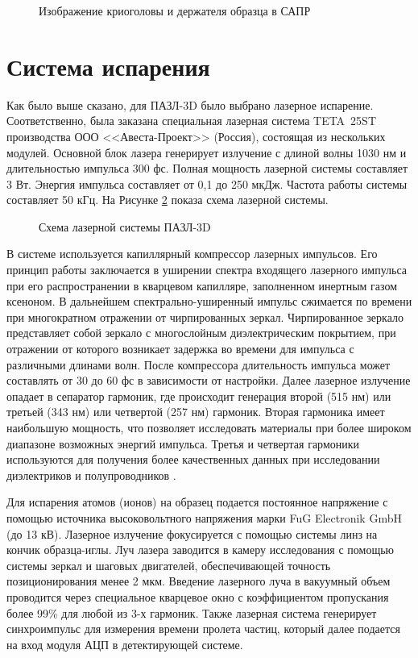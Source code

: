 \begin{figure}[htb]
	\caption{Изображение криоголовы и держателя образца в САПР}
	\label{fig:APPLE_cryosystem}
\end{figure}

\FloatBarrier

\section{Система испарения}\label{sec:ch2/sec3}

Как было выше сказано, для ПАЗЛ-3D было выбрано лазерное испарение. Соответственно, была заказана специальная лазерная система TETA~25ST производства ООО <<Авеста-Проект>> (Россия), состоящая из нескольких модулей. Основной блок лазера генерирует излучение с длиной волны 1030 нм и длительностью импульса 300 фс. Полная мощность лазерной системы составляет 3 Вт. Энергия импульса составляет от 0,1 до 250 мкДж. Частота работы системы составляет 50 кГц. На Рисунке \cref{fig:APPLE_lasersystem} показа схема лазерной системы.

\begin{figure}[htb]
	\caption{Схема лазерной системы ПАЗЛ-3D}
	\label{fig:APPLE_lasersystem}
\end{figure}

В системе используется капиллярный компрессор лазерных импульсов. Его принцип работы заключается в уширении спектра входящего лазерного импульса при его распространении в кварцевом капилляре, заполненном инертным газом ксеноном. В дальнейшем спектрально-уширенный импульс сжимается по времени при многократном отражении от чирпированных зеркал. Чирпированное зеркало представляет собой зеркало с многослойным диэлектрическим покрытием, при отражении от которого возникает задержка во времени для импульса с различными длинами волн. После компрессора длительность импульса может составлять от 30 до 60 фс в зависимости от настройки. Далее лазерное излучение опадает в сепаратор гармоник, где происходит генерация второй (515 нм) или третьей (343 нм) или четвертой (257 нм) гармоник. Вторая гармоника имеет наибольшую мощность, что позволяет исследовать материалы при более широком диапазоне возможных энергий импульса. Третья и четвертая гармоники используются для получения более качественных данных при исследовании диэлектриков и полупроводников \cite{Gault06}.

Для испарения атомов (ионов) на образец подается постоянное напряжение с помощью источника высоковольтного напряжения марки FuG Electronik GmbH (до 13 кВ). Лазерное излучение фокусируется с помощью системы линз на кончик образца-иглы. Луч лазера заводится в камеру исследования с помощью системы зеркал и шаговых двигателей, обеспечивающей точность позиционирования менее 2 мкм. Введение лазерного луча в вакуумный объем проводится через специальное кварцевое окно с коэффициентом пропускания более 99\% для любой из 3-х гармоник. Также лазерная система генерирует синхроимпульс для измерения времени пролета частиц, который далее подается на вход модуля АЦП в детектирующей системе.


